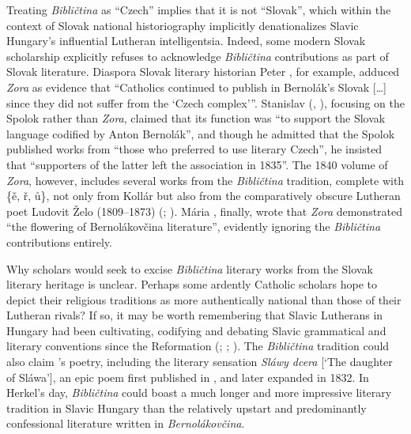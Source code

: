 Treating \textit{Bibličtina} as “Czech” implies that it is not “Slovak”, which within the context of Slovak national historiography implicitly denationalizes Slavic Hungary’s influential Lutheran intelligentsia. Indeed, some modern Slovak scholarship explicitly refuses to acknowledge \textit{Bibličtina} contributions as part of Slovak literature. Diaspora Slovak literary historian Peter \citet[67]{petro_history_1995}, for example, adduced \textit{Zora} as evidence that “Catholics continued to publish in Bernolák’s \linebreak{}Slovak […] since they did not suffer from the ‘Czech complex’”. Stanislav \citeauthor{kirschbaum_z_2010} (\citeyear[49]{kirschbaum_z_2010}, \citeyear[48]{kirschbaum_historical_2014}), focusing on the Spolok rather than \textit{Zora}, claimed that its function was “to support the Slovak language codified by Anton Berno\-lák”, and though he admitted that the Spolok published works from “those who preferred to use literary Czech”, he insisted that “supporters of the latter left the association in 1835”. The 1840 volume of \textit{Zora}, however, includes several works from the \textit{Bibličtina} tradition, complete with \{ě, ř, ů\}, not only from Kollár but also from the comparatively obscure Lutheran poet Ludovit Želo (1809--1873) (\cite[7--10, 275--80]{kollar_puwod_1840}; \cite[23--24]{zelo_slawy_1840}). Mária \citet[388]{zsilak_budai_2017}, finally, wrote that \textit{Zora} demonstrated “the flowering of Bernolákovčina literature”, evidently ignoring the \textit{Bibličtina} contributions entirely.

Why scholars would seek to excise \textit{Bibličtina} literary works from the Slovak literary heritage is unclear. Perhaps some ardently Catholic scholars hope to depict their religious traditions as more authentically national than those of their Lutheran rivals? If so, it may be worth remembering that Slavic Lutherans in Hungary had been cultivating, codifying and debating Slavic grammatical and literary conventions since the Reformation (\cite{masnicius_zprawa_1696}; \cite{dolezal_grammatica_1746}; \cite{palkovic_bohmisch-deutsch-lateinisches_18201821}). The \textit{Bibličtina} tradition could also claim \citeauthor{kollar_slawy_1824}’s poetry, including the literary sensation \textit{Sláwy dcera} [‘The daughter of Sláwa’], an epic poem first published in \citeyear{kollar_slawy_1824}, and later expanded in 1832. In Herkel’s day, \textit{Bibličtina} could boast a much longer and more impressive literary tradition in Slavic Hungary than the relatively upstart and predominantly confessional literature written in \textit{Bernolákovčina}.

